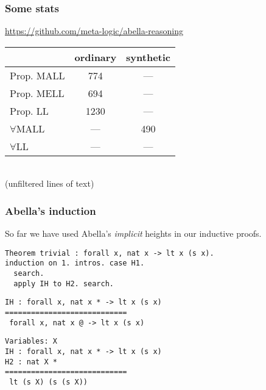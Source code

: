 \documentclass{beamer}
\begin{document}
\begin{frame}
  \frametitle{Some stats}

  \centering
  \url{https://github.com/meta-logic/abella-reasoning}

  \vspace{1cm}

  \begin{tabu}{l|c|c}
    & ordinary & synthetic \\\hline
    \vrule width 0pt height 1.3em
    Prop. MALL & \alert{774} & --- \\
    Prop. MELL & 694 & --- \\
    Prop. LL & 1230 & --- \\[1ex]
    $\forall$MALL & --- & \alert{490} \\
    $\forall$LL & --- & ---
  \end{tabu}\\
  {\scriptsize (unfiltered lines of text)}
\end{frame}

\begin{frame}[fragile]
  \frametitle{Abella's induction}

  So far we have used Abella's \emph{implicit} heights in our
  inductive proofs.

  \bigskip

\begin{lstlisting}
Theorem trivial : forall x, nat x -> lt x (s x).
induction on 1. intros. case H1.
  search.
  apply IH to H2. search.
\end{lstlisting}

  \pause

\begin{lstlisting}
IH : forall x, nat x * -> lt x (s x)
============================
 forall x, nat x @ -> lt x (s x)
\end{lstlisting}

  \pause

\begin{lstlisting}
Variables: X
IH : forall x, nat x * -> lt x (s x)
H2 : nat X *
============================
 lt (s X) (s (s X))
\end{lstlisting}

\end{frame}
\end{document}
